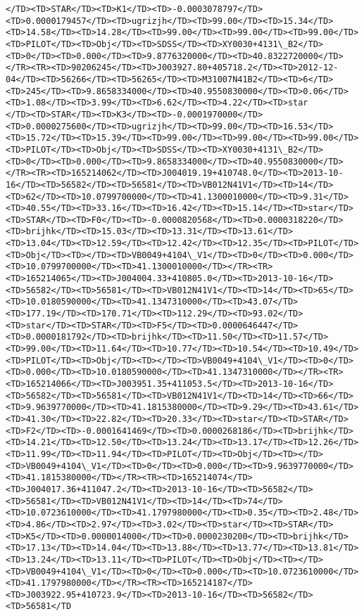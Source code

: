 \documentclass[11pt]{article}
\begin{document}
\begin{Verbatim}[commandchars=\\\{\}]
</TD><TD>STAR</TD><TD>K1</TD><TD>-0.0003078797</TD><TD>0.0000179457</TD><TD>ugrizjh</TD><TD>99.00</TD><TD>15.34</TD><TD>14.58</TD><TD>14.28</TD><TD>99.00</TD><TD>99.00</TD><TD>99.00</TD><TD>PILOT</TD><TD>Obj</TD><TD>SDSS</TD><TD>XY0030+4131\_B2</TD><TD>0</TD><TD>0.000</TD><TD>9.8776320000</TD><TD>40.8322720000</TD></TR><TR><TD>90206245</TD><TD>J003927.80+405718.2</TD><TD>2012-12-04</TD><TD>56266</TD><TD>56265</TD><TD>M31007N41B2</TD><TD>6</TD><TD>245</TD><TD>9.8658334000</TD><TD>40.9550830000</TD><TD>0.06</TD><TD>1.08</TD><TD>3.99</TD><TD>6.62</TD><TD>4.22</TD><TD>star      </TD><TD>STAR</TD><TD>K3</TD><TD>-0.0001970000</TD><TD>0.0000275600</TD><TD>ugrizjh</TD><TD>99.00</TD><TD>16.53</TD><TD>15.72</TD><TD>15.39</TD><TD>99.00</TD><TD>99.00</TD><TD>99.00</TD><TD>PILOT</TD><TD>Obj</TD><TD>SDSS</TD><TD>XY0030+4131\_B2</TD><TD>0</TD><TD>0.000</TD><TD>9.8658334000</TD><TD>40.9550830000</TD></TR><TR><TD>165214062</TD><TD>J004019.19+410748.0</TD><TD>2013-10-16</TD><TD>56582</TD><TD>56581</TD><TD>VB012N41V1</TD><TD>14</TD><TD>62</TD><TD>10.0799700000</TD><TD>41.1300010000</TD><TD>9.31</TD><TD>40.55</TD><TD>33.16</TD><TD>16.42</TD><TD>15.14</TD><TD>star</TD><TD>STAR</TD><TD>F0</TD><TD>-0.0000820568</TD><TD>0.0000318220</TD><TD>brijhk</TD><TD>15.03</TD><TD>13.31</TD><TD>13.61</TD><TD>13.04</TD><TD>12.59</TD><TD>12.42</TD><TD>12.35</TD><TD>PILOT</TD><TD>Obj</TD><TD></TD><TD>VB0049+4104\_V1</TD><TD>0</TD><TD>0.000</TD><TD>10.0799700000</TD><TD>41.1300010000</TD></TR><TR><TD>165214065</TD><TD>J004004.33+410805.0</TD><TD>2013-10-16</TD><TD>56582</TD><TD>56581</TD><TD>VB012N41V1</TD><TD>14</TD><TD>65</TD><TD>10.0180590000</TD><TD>41.1347310000</TD><TD>43.07</TD><TD>177.19</TD><TD>170.71</TD><TD>112.29</TD><TD>93.02</TD><TD>star</TD><TD>STAR</TD><TD>F5</TD><TD>0.0000646447</TD><TD>0.0000181792</TD><TD>brijhk</TD><TD>11.50</TD><TD>11.57</TD><TD>99.00</TD><TD>11.64</TD><TD>10.77</TD><TD>10.54</TD><TD>10.49</TD><TD>PILOT</TD><TD>Obj</TD><TD></TD><TD>VB0049+4104\_V1</TD><TD>0</TD><TD>0.000</TD><TD>10.0180590000</TD><TD>41.1347310000</TD></TR><TR><TD>165214066</TD><TD>J003951.35+411053.5</TD><TD>2013-10-16</TD><TD>56582</TD><TD>56581</TD><TD>VB012N41V1</TD><TD>14</TD><TD>66</TD><TD>9.9639770000</TD><TD>41.1815380000</TD><TD>9.29</TD><TD>43.61</TD><TD>41.30</TD><TD>22.82</TD><TD>20.33</TD><TD>star</TD><TD>STAR</TD><TD>F2</TD><TD>-0.0001641469</TD><TD>0.0000268186</TD><TD>brijhk</TD><TD>14.21</TD><TD>12.50</TD><TD>13.24</TD><TD>13.17</TD><TD>12.26</TD><TD>11.99</TD><TD>11.94</TD><TD>PILOT</TD><TD>Obj</TD><TD></TD><TD>VB0049+4104\_V1</TD><TD>0</TD><TD>0.000</TD><TD>9.9639770000</TD><TD>41.1815380000</TD></TR><TR><TD>165214074</TD><TD>J004017.36+411047.2</TD><TD>2013-10-16</TD><TD>56582</TD><TD>56581</TD><TD>VB012N41V1</TD><TD>14</TD><TD>74</TD><TD>10.0723610000</TD><TD>41.1797980000</TD><TD>0.35</TD><TD>2.48</TD><TD>4.86</TD><TD>2.97</TD><TD>3.02</TD><TD>star</TD><TD>STAR</TD><TD>K5</TD><TD>0.0000014000</TD><TD>0.0000230200</TD><TD>brijhk</TD><TD>17.13</TD><TD>14.04</TD><TD>13.88</TD><TD>13.77</TD><TD>13.81</TD><TD>13.24</TD><TD>13.11</TD><TD>PILOT</TD><TD>Obj</TD><TD></TD><TD>VB0049+4104\_V1</TD><TD>0</TD><TD>0.000</TD><TD>10.0723610000</TD><TD>41.1797980000</TD></TR><TR><TD>165214187</TD><TD>J003922.95+410723.9</TD><TD>2013-10-16</TD><TD>56582</TD><TD>56581</TD
\end{Verbatim}
\end{document}
